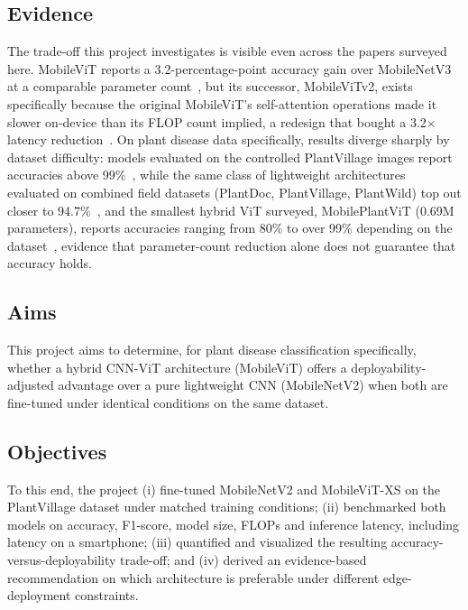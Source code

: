 \documentclass[conference]{IEEEtran}
\begin{document}
\subsection{Evidence}

The trade-off this project investigates is visible even across the papers surveyed here. MobileViT reports a 3.2-percentage-point accuracy gain over MobileNetV3 at a comparable parameter count~\cite{mehta2022mobilevit}, but its successor, MobileViTv2, exists specifically because the original MobileViT's self-attention operations made it slower on-device than its FLOP count implied, a redesign that bought a 3.2$\times$ latency reduction~\cite{mehta2022mobilevitv2}. On plant disease data specifically, results diverge sharply by dataset difficulty: models evaluated on the controlled PlantVillage images report accuracies above 99\%~\cite{mohanty2016plant,karthikeyan2025cnnseeib,pal2025mobres}, while the same class of lightweight architectures evaluated on combined field datasets (PlantDoc, PlantVillage, PlantWild) top out closer to 94.7\%~\cite{kumar2025mobilefriendly}, and the smallest hybrid ViT surveyed, MobilePlantViT (0.69M parameters), reports accuracies ranging from 80\% to over 99\% depending on the dataset~\cite{tonmoy2025mobileplantvit}, evidence that parameter-count reduction alone does not guarantee that accuracy holds.

\subsection{Aims}

This project aims to determine, for plant disease classification specifically, whether a hybrid CNN-ViT architecture (MobileViT) offers a deployability-adjusted advantage over a pure lightweight CNN (MobileNetV2) when both are fine-tuned under identical conditions on the same dataset.

\subsection{Objectives}

To this end, the project (i) fine-tuned MobileNetV2 and MobileViT-XS on the PlantVillage dataset under matched training conditions; (ii) benchmarked both models on accuracy, F1-score, model size, FLOPs and inference latency, including latency on a smartphone; (iii) quantified and visualized the resulting accuracy-versus-deployability trade-off; and (iv) derived an evidence-based recommendation on which architecture is preferable under different edge-deployment constraints.
\end{document}
